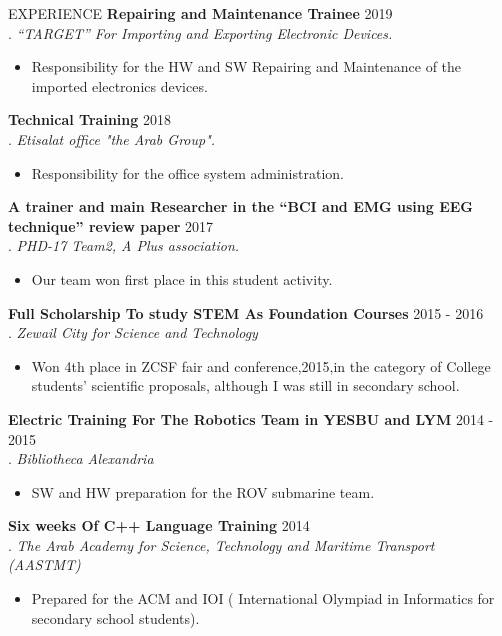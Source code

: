 \documentclass{resume} %
\begin{document}
\begin{rSection}{EXPERIENCE}
    \textbf{Repairing and Maintenance Trainee} \hfill    2019\\
. \hfill \textit{“TARGET” For Importing and Exporting Electronic Devices.}
  \begin{itemize}
     \itemsep -3pt {} 
      \item  Responsibility for the HW and SW Repairing and Maintenance of the imported electronics devices.
 \end{itemize}
 
     \textbf{Technical Training} \hfill   2018\\
. \hfill \textit{Etisalat office "the Arab Group".}
  \begin{itemize}
     \itemsep -3pt {} 
      \item  Responsibility for the office system administration.
 \end{itemize}

     \textbf{A trainer and main Researcher in the “BCI and EMG using EEG technique” review paper} \hfill   2017\\
. \hfill \textit{PHD-17 Team2, A Plus association.}
  \begin{itemize}
     \itemsep -3pt {} 
      \item  Our team won first place in this student activity.
 \end{itemize}
 
 \textbf{Full Scholarship To study STEM As Foundation Courses} \hfill  2015 -  2016\\
. \hfill \textit{Zewail City for Science and Technology}
  \begin{itemize}
     \itemsep -3pt {} 
      \item Won 4th place in ZCSF fair and conference,2015,in the category of College students’ scientific proposals, although I was still in secondary school.
\end{itemize}

     \textbf{Electric Training For The Robotics Team in YESBU and LYM} \hfill   2014 - 2015\\
. \hfill \textit{Bibliotheca Alexandria}
  \begin{itemize}
     \itemsep -3pt {} 
      \item  SW and HW preparation for the ROV submarine team.
 \end{itemize}

     \textbf{Six weeks Of C++ Language Training} \hfill   2014\\
. \hfill \textit{The Arab Academy for Science, Technology and Maritime Transport (AASTMT) }
  \begin{itemize}
     \itemsep -3pt {} 
      \item  Prepared for the ACM and IOI ( International Olympiad in Informatics for secondary school students).
 \end{itemize}
 
 \end{rSection} 
\end{document}

